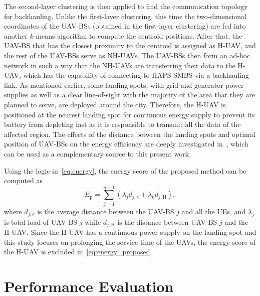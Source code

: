 \documentclass[conference, a4paper]{IEEEtran}
\begin{document}
The second-layer clustering is then applied to find the communication topology for backhauling.
Unlike the first-layer clustering, this time the two-dimensional coordinates of the UAV-BSs (obtained in the first-layer clustering) are fed into another $k$-means algorithm to compute the centroid positions.
After that, the UAV-BS that has the closest proximity to the centroid is assigned as H-UAV, and the rest of the UAV-BSs serve as NH-UAVs.
The UAV-BSs then form an ad-hoc network in such a way that the NH-UAVs are transferring their data to the H-UAV, which has the capability of connecting to HAPS-SMBS via a backhauling link.
As mentioned earlier, some landing spots, with grid and generator power supplies as well as a clear line-of-sight with the majority of the area that they are planned to serve, are deployed around the city.
Therefore, the H-UAV is positioned at the nearest landing spot for continuous energy supply to prevent its battery from depleting fast as it is responsible to transmit all the data of the affected region.
The effects of the distance between the landing spots and optimal position of UAV-BSs on the energy efficiency are deeply investigated in~\cite{landing_UAV}, which can be used as a complementary source to this present work.

Using the logic in~\eqref{eq:energy}, the energy score of the proposed method can be computed as 
\begin{equation}\label{eq:energy_proposed}
    E_\text{p} = \sum_{j=1}^{n-1} (\lambda_j \overline{d_{j,e}}+\lambda_k d_{j,\text{H}}),
\end{equation}
where $\overline{d_{j,e}}$ is the average distance between the UAV-BS $j$ and all the UEs, and $\lambda_j$ is total load of UAV-BS $j$ while $d_{j,\text{H}}$ is the distance between UAV-BS $j$ and the H-UAV.
Since the H-UAV has a continuous power supply on the landing spot and this study focuses on prolonging the service time of the UAVs, the energy score of the H-UAV is excluded in~\eqref{eq:energy_proposed}.

\section{Performance Evaluation}
\end{document}
